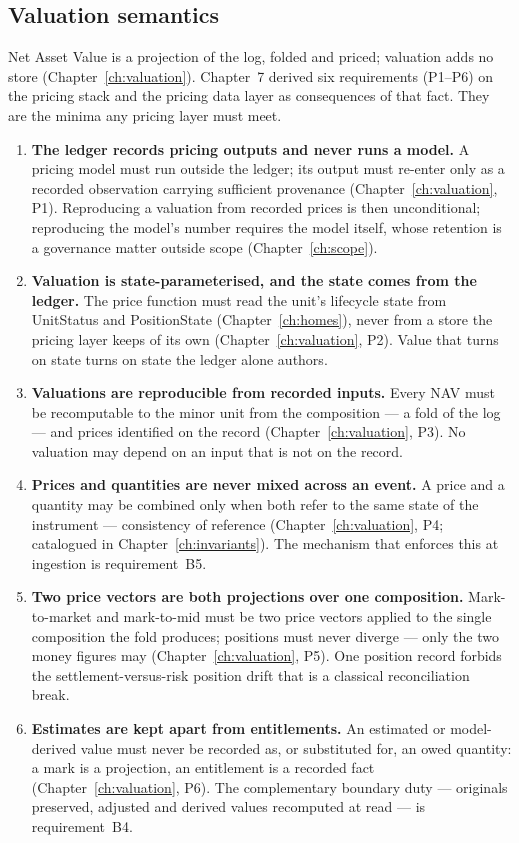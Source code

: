 \subsection{Valuation semantics}

Net Asset Value is a projection of the log, folded and priced; valuation adds no store
(Chapter~\ref{ch:valuation}). Chapter~7 derived six requirements (P1--P6) on the pricing
stack and the pricing data layer as consequences of that fact. They are the minima any
pricing layer must meet.

\begin{enumerate}[label=\textbf{V\arabic*.}, ref=V\arabic*, leftmargin=*, itemsep=3pt]
\item \textbf{The ledger records pricing outputs and never runs a model.} A pricing model
  must run outside the ledger; its output must re-enter only as a recorded observation
  carrying sufficient provenance (Chapter~\ref{ch:valuation}, P1). Reproducing a valuation
  from recorded prices is then unconditional; reproducing the model's number requires the
  model itself, whose retention is a governance matter outside scope
  (Chapter~\ref{ch:scope}).
\item \textbf{Valuation is state-parameterised, and the state comes from the ledger.} The
  price function must read the unit's lifecycle state from UnitStatus and PositionState
  (Chapter~\ref{ch:homes}), never from a store the pricing layer keeps of its own
  (Chapter~\ref{ch:valuation}, P2). Value that turns on state turns on state the ledger
  alone authors.
\item \textbf{Valuations are reproducible from recorded inputs.} Every NAV must be
  recomputable to the minor unit from the composition --- a fold of the log --- and prices
  identified on the record (Chapter~\ref{ch:valuation}, P3). No valuation may depend on an
  input that is not on the record.
\item \textbf{Prices and quantities are never mixed across an event.} A price and a
  quantity may be combined only when both refer to the same state of the instrument ---
  consistency of reference (Chapter~\ref{ch:valuation}, P4; catalogued in
  Chapter~\ref{ch:invariants}). The mechanism that enforces this at ingestion is
  requirement~B5.
\item \textbf{Two price vectors are both projections over one composition.} Mark-to-market
  and mark-to-mid must be two price vectors applied to the single composition the fold
  produces; positions must never diverge --- only the two money figures may
  (Chapter~\ref{ch:valuation}, P5). One position record forbids the settlement-versus-risk
  position drift that is a classical reconciliation break.
\item \textbf{Estimates are kept apart from entitlements.} An estimated or model-derived
  value must never be recorded as, or substituted for, an owed quantity: a mark is a
  projection, an entitlement is a recorded fact (Chapter~\ref{ch:valuation}, P6). The
  complementary boundary duty --- originals preserved, adjusted and derived values
  recomputed at read --- is requirement~B4.
\end{enumerate}

